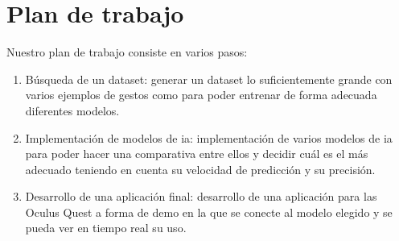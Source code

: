 \section{Plan de trabajo}
Nuestro plan de trabajo consiste en varios pasos:
\begin{enumerate}
	\item Búsqueda de un dataset: generar un dataset lo suficientemente grande con varios ejemplos de gestos como para poder entrenar de forma adecuada diferentes modelos.
	\item Implementación de modelos de \gls{ia}: implementación de varios modelos de \gls{ia} para poder hacer una comparativa entre ellos y decidir cuál es el más adecuado teniendo en cuenta su velocidad de predicción y su precisión.
	\item Desarrollo de una aplicación final: desarrollo de una aplicación para las Oculus Quest a forma de demo en la que se conecte al modelo elegido y se pueda ver en tiempo real su uso.
\end{enumerate}